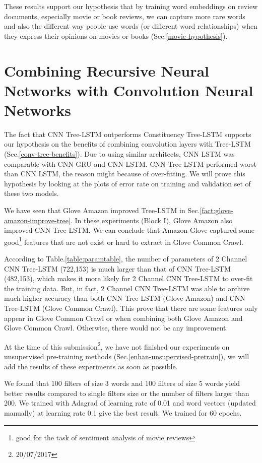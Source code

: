 These results support our hypothesis that by training word embeddings on review documents, especially movie or book reviews, we can capture more rare words and also the different way people use words (or different word relationships) when they express their opinions on movies or books (Sec.\ref{movie-hypothesis}). 
 
\section{Combining Recursive Neural Networks with Convolution Neural Networks}
\label{proved:tree-conv-benefit}
The fact that CNN Tree-LSTM outperforms Constituency Tree-LSTM\cite{treeLSTM} supports our hypothesis on the benefits of combining convolution layers with Tree-LSTM (Sec.\ref{conv-tree-benefits}).
Due to using similar architects, CNN LSTM was comparable with CNN GRU and CNN LSTM\cite{cnn-rnn}. \label{unproved:cnn-treelstm-overfit}
CNN Tree-LSTM performed worst than CNN LSTM, the reason might because of over-fitting.
We will prove this hypothesis by looking at the plots of error rate on training and validation set of these two models.

\label{proved:Amazon-adv-Common}
We have seen that Glove Amazon improved Tree-LSTM in Sec.\ref{fact:glove-amazon-improve-tree}.
In these experiments (Block I), Glove Amazon also improved CNN Tree-LSTM.
We can conclude that Amazon Glove captured some good\footnote{good for the task of sentiment analysis of movie reviews} features that are not exist or hard to extract in Glove Common Crawl.

According to Table.\ref{table:paramtable}, the number of parameters of 2 Channel CNN Tree-LSTM (722,153) is much larger than that of CNN Tree-LSTM (482,153), which makes it more likely for 2 Channel CNN Tree-LSTM to over-fit the training data.
But, in fact, 2 Channel CNN Tree-LSTM was able to archive much higher accuracy than both CNN Tree-LSTM (Glove Amazon) and CNN Tree-LSTM (Glove Common Crawl).\label{proved:Common-syn-Amazon}
This prove that there are some features only appear in Glove Common Crawl or when combining both Glove Amazon and Glove Common Crawl.
Otherwise, there would not be any improvement.  

At the time of this submission\footnote{20/07/2017}, we have not finished our experiments on unsupervised pre-training methods (Sec.\ref{enhan-unsupervised-pretrain}), we will add the results of these experiments as soon as possible. 

We found that 100 filters of size 3 words and 100 filters of size 5 words yield better results compared to single filters size or the number of filters larger than 200. We trained with Adagrad of learning rate of 0.01 and word vectors (updated manually) at learning rate 0.1 give the best result. We trained for 60 epochs.
